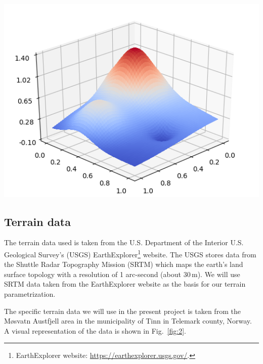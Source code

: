 \documentclass[a4paper]{article}
\newcommand{\fig}[1]{Fig.\ \ref{fig:#1}}
\newenvironment{Figure}
  {\par\medskip\noindent\minipage{\linewidth}}
  {\endminipage\par\medskip}
\begin{document}
\begin{multicols}{2}
\begin{Figure}
\centering
\includegraphics[width=\linewidth]{franke.png}
\end{Figure}

\subsection{Terrain data}
The terrain data used is taken from the U.S. Department of the Interior U.S. Geological Survey's (USGS) EarthExplorer\footnote{EarthExplorer website: \url{https://earthexplorer.usgs.gov/}.} website. The USGS stores data from the Shuttle Radar Topography Mission (SRTM) which maps the earth's land surface topology with a resolution of 1 arc-second (about $30\,\text{m}$). We will use SRTM data taken from the EarthExplorer website as the basis for our terrain parametrization.

The specific terrain data we will use in the present project is taken from the Møsvatn Austfjell area in the municipality of Tinn in Telemark county, Norway. A visual representation of the data is shown in \fig{2}. 


\end{multicols}
\end{document}
